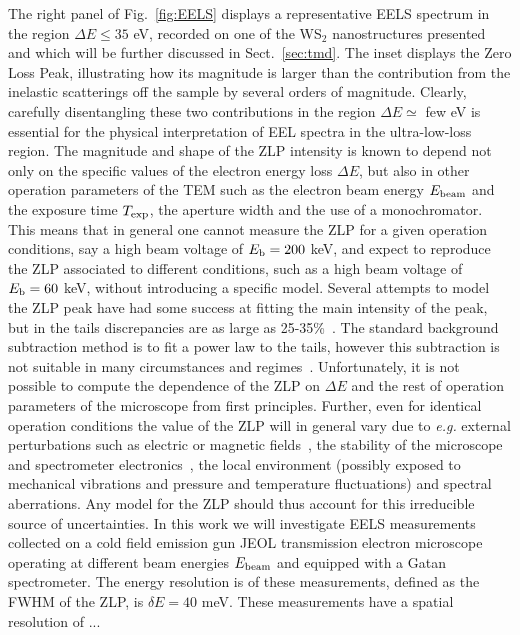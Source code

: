 The right panel of Fig.~\ref{fig:EELS} displays
a representative EELS spectrum in the region $\Delta E \le 35$ eV, recorded
on one of the WS$_2$ nanostructures presented~\cite{SabryaWS2}
and which will be further discussed in Sect.~\ref{sec:tmd}.
%
The inset displays the Zero Loss Peak, illustrating how
its magnitude is larger than the contribution from the inelastic scatterings
off the sample by several
orders of magnitude.
%
Clearly, carefully disentangling these two contributions in the region $\Delta E \simeq$ few eV
is essential for the physical interpretation of EEL spectra in the ultra-low-loss region.
%
The magnitude and shape of the ZLP intensity is known to depend not only on the specific values
of the electron energy loss $\Delta E$, but also in other operation parameters
of the TEM such as the electron beam energy $E_{\rm beam}$ and the exposure time
$T_{\rm exp}$, the aperture width and the use of a monochromator. 
%
This means that in general one cannot measure the ZLP for a given operation
conditions, say a high beam voltage of $E_{\rm b}=200$ keV, and expect to reproduce
the ZLP associated to different conditions, such as a  high beam voltage of $E_{\rm b}=60$ keV,
without introducing a specific model.
%
Several attempts to model the ZLP peak have had some success at fitting the main intensity of the peak, 
but in the tails discrepancies are as large as 25-35\%~\cite{Bangert:2003}. The standard background 
subtraction method is to fit a power law to the tails, however this subtraction is not suitable in
many circumstances and regimes~\cite{Hachtel:2018, Tenailleau:1992, Reed:2002, Bosman:2006}.
%
Unfortunately, it is not possible to compute the dependence of the ZLP on $\Delta E$
and the rest of operation parameters of the microscope from first principles.
%
Further, even for identical operation conditions the value of the ZLP
will in general vary due to {\it e.g.} external perturbations such as electric or magnetic fields~\cite{Rafferty:2000},
the stability of the microscope and spectrometer electronics~\cite{Kothleitner:2003}, the local
environment (possibly exposed to mechanical vibrations and pressure and temperature fluctuations) 
and spectral aberrations\cite{Egerton:1996, Scherzer:1949}. 
%
Any model for the ZLP should thus account for this irreducible source of uncertainties.
%
In this work we will investigate EELS measurements collected  on a cold field emission gun JEOL
transmission electron microscope operating at different beam energies $E_{\rm beam}$
and equipped with a  Gatan spectrometer.
%
The energy resolution is of these measurements,
defined as the FWHM of the ZLP, is $\delta E=40$ meV.
%
These measurements have a spatial resolution of ...

